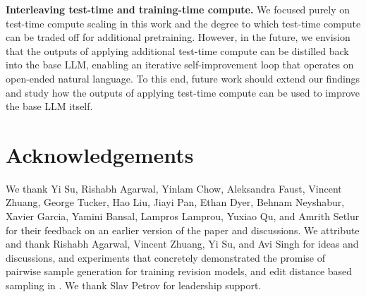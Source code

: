 \textbf{Interleaving test-time and training-time compute.} We focused purely on test-time compute scaling in this work and the degree to which test-time compute can be traded off for additional pretraining. However, in the future, we envision that the outputs of applying additional test-time compute can be distilled back into the base LLM, enabling an iterative self-improvement loop that operates on open-ended natural language. To this end, future work should extend our findings and study how the outputs of applying test-time compute can be used to improve the base LLM itself.

\vspace{-0.2cm}
\section*{Acknowledgements}
\vspace{-0.2cm}
We thank Yi Su, Rishabh Agarwal, Yinlam Chow, Aleksandra Faust, Vincent Zhuang, George Tucker, Hao Liu, Jiayi Pan, Ethan Dyer, Behnam Neyshabur, Xavier Garcia, Yamini Bansal, Lampros Lamprou, Yuxiao Qu, and Amrith Setlur for their feedback on an earlier version of the paper and discussions. We attribute and thank Rishabh Agarwal, Vincent Zhuang, Yi Su, and Avi Singh for ideas and discussions, and experiments that concretely demonstrated the promise of pairwise sample generation for training revision models, and edit distance based sampling in \citep{anonymousrevisions}. We thank Slav Petrov for leadership support.

